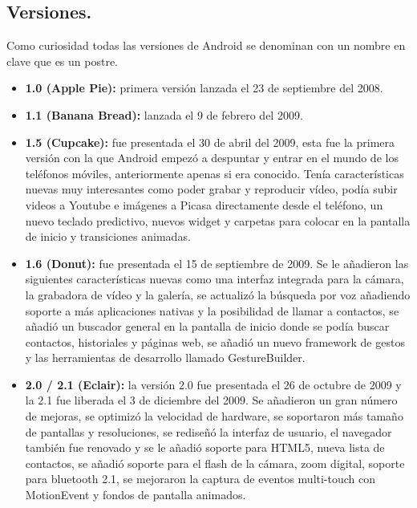 \subsection{Versiones.}

Como curiosidad todas las versiones de Android se denominan con un nombre en clave que es un postre.
\begin{itemize}

	\item \textbf{1.0 (Apple Pie):} primera versión lanzada el 23 de septiembre del 2008.
	
	\item \textbf{1.1 (Banana Bread):} lanzada el 9 de febrero del 2009.
	
	\item \textbf{1.5 (Cupcake):} fue presentada el 30 de abril del 2009, esta fue la primera versión con la que Android empezó a despuntar y entrar en el mundo de los teléfonos móviles, anteriormente apenas si era conocido. Tenía características nuevas muy interesantes como poder grabar y reproducir vídeo, podía subir videos a Youtube e imágenes a Picasa directamente desde el teléfono, un nuevo teclado predictivo, nuevos widget y carpetas para colocar en la pantalla de inicio y transiciones animadas.

	\item \textbf{1.6 (Donut):} fue presentada el 15 de septiembre de 2009. Se le añadieron las siguientes características nuevas como una interfaz integrada para la cámara, la grabadora de vídeo y la galería, se actualizó la búsqueda por voz añadiendo soporte a más aplicaciones nativas y la posibilidad de llamar a contactos, se añadió un buscador general en la pantalla de inicio donde se podía buscar contactos, historiales y páginas web, se añadió un nuevo framework de gestos y las herramientas de desarrollo llamado GestureBuilder.

	\item \textbf{2.0 / 2.1 (Eclair):} la versión 2.0 fue presentada el 26 de octubre de 2009 y la 2.1 fue liberada el 3 de diciembre del 2009. Se añadieron un gran número de mejoras, se optimizó la velocidad de hardware, se soportaron más tamaño de pantallas y resoluciones, se rediseñó la interfaz de usuario, el navegador también fue renovado y se le añadió soporte para HTML5, nueva lista de contactos, se añadió soporte para el flash de la cámara, zoom digital, soporte para bluetooth 2.1, se mejoraron la captura de eventos multi-touch con MotionEvent y fondos de pantalla animados.
	

\end{itemize}
